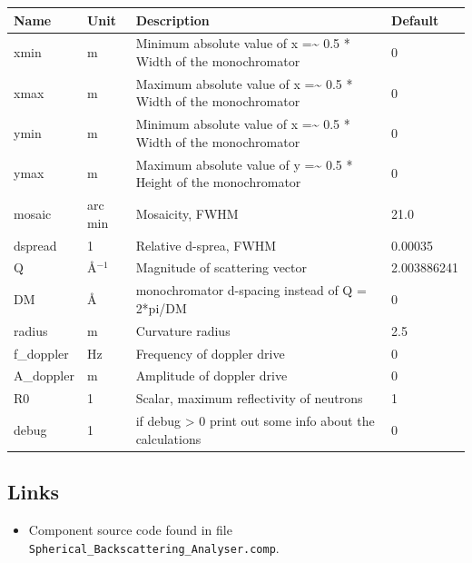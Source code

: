 \begin{longtable}{p{}p{}p{}p{}}
\toprule
\textbf{Name} & \textbf{Unit} & \textbf{Description} & \textbf{Default} \\
\midrule
\endhead
xmin & m & Minimum absolute value of x =\textasciitilde{} 0.5 * Width of the monochromator & 0 \\
xmax & m & Maximum absolute value of x =\textasciitilde{} 0.5 * Width of the monochromator & 0 \\
ymin & m & Minimum absolute value of x =\textasciitilde{} 0.5 * Width of the monochromator & 0 \\
ymax & m & Maximum absolute value of y =\textasciitilde{} 0.5 * Height of the monochromator & 0 \\
mosaic & arc min & Mosaicity, FWHM & 21.0 \\
dspread & 1 & Relative d-sprea, FWHM & 0.00035 \\
Q & \AA{}$^{-1}$ & Magnitude of scattering vector & 2.003886241 \\
DM & \AA{} & monochromator d-spacing instead of Q = 2*pi/DM & 0 \\
radius & m & Curvature radius & 2.5 \\
f\_doppler & Hz & Frequency of doppler drive & 0 \\
A\_doppler & m & Amplitude of doppler drive & 0 \\
R0 & 1 & Scalar, maximum reflectivity of neutrons & 1 \\
debug & 1 & if debug \textgreater{} 0 print out some info about the calculations & 0 \\
\bottomrule
\end{longtable}

\subsection*{Links}
\begin{itemize}
  \item Component source code found in file \texttt{Spherical\_Backscattering\_Analyser.comp}.
\end{itemize}
